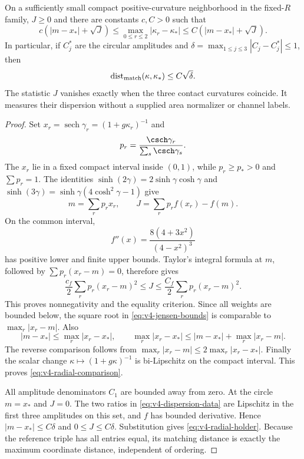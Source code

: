 \begin{theorem}
\label{thm:v4-radial-stability}
On a sufficiently small compact positive-curvature neighborhood in the
fixed-$R$ family, $J\ge0$ and there are constants $c,C>0$ such that
\begin{equation}\label{eq:v4-radial-comparison}
 c\left(|m-x_*|+\sqrt J\right)
 \le \max_{0\le r\le2}|\kappa_r-\kappa_*|
 \le C\left(|m-x_*|+\sqrt J\right).
\end{equation}
In particular, if $C_j^*$ are the circular amplitudes and
$\delta=\max_{1\le j\le3}|C_j-C_j^*|\le1$, then
\begin{equation}\label{eq:v4-radial-holder}
 \operatorname{dist}_{\rm match}(\kappa,\kappa_*)
                                                    \le C\sqrt\delta.
\end{equation}
The statistic $J$ vanishes exactly when the three contact curvatures
coincide. It measures their dispersion without a supplied area
normalizer or channel labels.
\end{theorem}
\begin{proof}
Set $x_r=\operatorname{sech}\gamma_r=(1+g\kappa_r)^{-1}$ and
\[
 p_r=\frac{\csch\gamma_r}{\sum_s\csch\gamma_s}.
\]
The $x_r$ lie in a fixed compact interval inside $(0,1)$, while
$p_r\ge p_*>0$ and $\sum p_r=1$. The identities
$\sinh(2\gamma)=2\sinh\gamma\cosh\gamma$ and
$\sinh(3\gamma)=\sinh\gamma(4\cosh^2\gamma-1)$ give
\begin{equation}\label{eq:v4-jensen}
 m=\sum_rp_rx_r,\qquad J=\sum_rp_rf(x_r)-f(m).
\end{equation}
On the common interval,
\[
 f''(x)=\frac{8(4+3x^2)}{(4-x^2)^3}
\]
has positive lower and finite upper bounds. Taylor's integral formula
at $m$, followed by $\sum p_r(x_r-m)=0$, therefore gives
\begin{equation}\label{eq:v4-jensen-bounds}
 \frac{c_f}{2}\sum_rp_r(x_r-m)^2\le J
       \le\frac{C_f}{2}\sum_rp_r(x_r-m)^2.
\end{equation}
This proves nonnegativity and the equality criterion. Since all
weights are bounded below, the square root in
\eqref{eq:v4-jensen-bounds} is comparable to
$\max_r|x_r-m|$. Also
\[
 |m-x_*|\le\max_r|x_r-x_*|,\qquad
 \max_r|x_r-x_*|\le |m-x_*|+\max_r|x_r-m|.
\]
The reverse comparison follows from
$\max_r|x_r-m|\le2\max_r|x_r-x_*|$.
Finally the scalar change $\kappa\mapsto(1+g\kappa)^{-1}$ is
bi-Lipschitz on the compact interval. This proves
\eqref{eq:v4-radial-comparison}.

All amplitude denominators $C_1$ are bounded away from zero. At the
circle $m=x_*$ and $J=0$. The two ratios in
\eqref{eq:v4-dispersion-data} are Lipschitz in the first three
amplitudes on this set, and $f$ has bounded derivative. Hence
$|m-x_*|\le C\delta$ and $0\le J\le C\delta$.
Substitution gives \eqref{eq:v4-radial-holder}. Because the reference
triple has all entries equal, its matching distance is exactly the
maximum coordinate distance, independent of ordering.
\end{proof}

